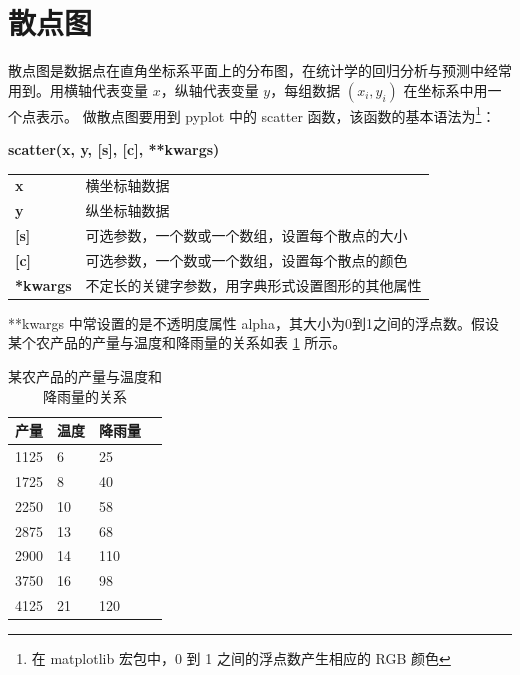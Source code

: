 \section{散点图}

散点图是数据点在直角坐标系平面上的分布图，在统计学的回归分析与预测中经常用到。用横轴代表变量 $x$，纵轴代表变量 $y$，每组数据 $(x_i, y_i)$ 在坐标系中用一个点表示。
做散点图要用到 pyplot 中的 scatter 函数，该函数的基本语法为\footnote{在 matplotlib 宏包中，0 到 1 之间的浮点数产生相应的 RGB 颜色}：

\begin{center}
\begin{tcolorbox}[title = scatter 函数的语法]
\textbf{scatter(x, y, [s], [c], **kwargs)}
\tcblower
\vspace{10pt}

\begin{tcboutputlisting}
\begin{tabular}{>{\bfseries}ll}
  x &横坐标轴数据\\
  y & 纵坐标轴数据\\

[s] &可选参数，一个数或一个数组，设置每个散点的大小\\

[c] &可选参数，一个数或一个数组，设置每个散点的颜色\\
**kwargs &不定长的关键字参数，用字典形式设置图形的其他属性
\end{tabular}
\end{tcboutputlisting}
\tcbuselistingtext

\end{tcolorbox}
\end{center}

**kwargs 中常设置的是不透明度属性 alpha，其大小为0到1之间的浮点数。假设某个农产品的产量与温度和降雨量的关系如表 \ref{table:scatter} 所示。

\begin{table}[!ht]
\centering
\renewcommand{\arraystretch}{1.2}
\caption{某农产品的产量与温度和降雨量的关系}\label{table:scatter}
\begin{tabular}{|l|l|l|l|}
\hline
产量 & 温度 & 降雨量 \\ \hline
1125 & 6 & 25 \\ \hline
1725 & 8 & 40 \\ \hline
2250 & 10 & 58 \\ \hline
2875 & 13 & 68 \\ \hline
2900 & 14 & 110 \\ \hline
3750 & 16 & 98 \\ \hline
4125 & 21 & 120 \\ \hline

\end{tabular}
\end{table}

